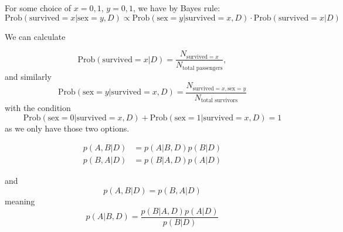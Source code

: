 \documentclass{book}
\begin{document}
For some choice of $x=0,1$, $y=0,1$, we have by Bayes rule:
\begin{equation}
    \text{Prob}(\text{survived}=x | \text{sex}=y, D) \propto \text{Prob}( \text{sex}=y|\text{survived}=x,D ) \cdot \text{Prob}(\text{survived}=x|D)
\end{equation}

We can calculate 

\begin{equation}
    \text{Prob}(\text{survived}=x|D) = \frac{N_{\text{survived}=x}}{N_\text{total passengers}},
\end{equation}
and similarly 
\begin{equation}
    \text{Prob}(\text{sex}=y|\text{survived}=x, D) = \frac{N_{\text{survived}=x, \text{sex}=y}}{N_\text{total survivors}}
\end{equation}
with the condition 
\begin{equation}
    \text{Prob}(\text{sex}=0|\text{survived}=x, D) + \text{Prob}(\text{sex}=1|\text{survived}=x, D) = 1
\end{equation}
as we only have those two options.


\clearpage
\begin{equation}
    \begin{split}
        p(A,B|D) & = p(A|B,D)p(B|D) \\
        p(B,A|D) & = p(B|A,D)p(A|D)
    \end{split}
\end{equation}

and
\begin{equation}
    p(A,B|D) = p(B,A|D)
\end{equation}
meaning 
\begin{equation}
    p(A|B,D) =  \frac{p(B|A,D)p(A|D)}{p(B|D)}
\end{equation}




\clearpage
\end{document}
